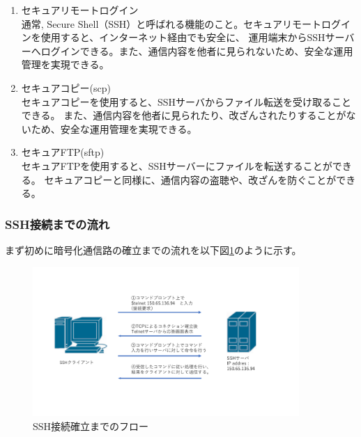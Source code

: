 \documentclass[12pt,a4paper,titlepage]{jsarticle}
\begin{document}
\begin{enumerate}
    \item セキュアリモートログイン\mbox{}\\通常,
    Secure Shell（SSH）と呼ばれる機能のこと。セキュアリモートログインを使用すると、インターネット経由でも安全に、
    運用端末からSSHサーバーへログインできる。また、通信内容を他者に見られないため、安全な運用管理を実現できる。
    \item セキュアコピー(scp)\mbox{}\\セキュアコピーを使用すると、SSHサーバからファイル転送を受け取ることできる。
    また、通信内容を他者に見られたり、改ざんされたりすることがないため、安全な運用管理を実現できる。
    \item セキュアFTP(sftp)\mbox{}\\セキュアFTPを使用すると、SSHサーバーにファイルを転送することができる。
    セキュアコピーと同様に、通信内容の盗聴や、改ざんを防ぐことができる。
\end{enumerate}



\subsubsection{SSH接続までの流れ}

まず初めに暗号化通信路の確立までの流れを以下図\ref{SSH_flow}のように示す。
\begin{figure}[h]
    \centering
    \includegraphics[width=0.9\textwidth, page=5]{graphs/network_archtecture.pdf}
    \caption{SSH接続確立までのフロー}
    \label{SSH_flow}
\end{figure}
\end{document}

